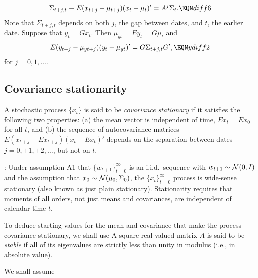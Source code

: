 $$ \Sigma_{t+j,t} \equiv E (x_{t+j} - \mu_{t+j}) (x_t - \mu_t)' =
       A^j \Sigma_t. \EQN diff6 $$
Note that $\Sigma_{t+j,t}$ depends on both $j$, the gap between dates, and $t$, the earlier
date.
%
Suppose that $y_t = G x_t$.  Then
 $\mu_{yt}= E y_t = G \mu_t$ and
$$ E (y_{t+j} - \mu_{yt+j}) (y_t - \mu_{yt})'
                              = G \Sigma_{t+j,t} G',  \EQN ydiff2  $$
for $j=0, 1,\ldots$.



\subsection{Covariance stationarity}

%
\medskip
  A stochastic process $\{x_t\}$ is said to
be {\it covariance stationary\/} if it
satisfies the following two properties: (a) the mean vector is
independent of time,
 $ E x_t = E x_0$ for all $t$,
 and (b) the sequence of autocovariance matrices
 $E(x_{t+j} - E x_{t+j})(x_t - E x_t)'$
depends on the separation between dates
 $j = 0, \pm 1, \pm 2, \ldots$, but not on $t$.
\enddefinition
\smallskip


:  Under assumption A1 that $\{w_{t+1}\}_{t=0}^\infty $ is an i.i.d.~sequence
with $w_{t+1} \sim {\cal N}(0,I)$ and the assumption that $x_0 \sim {\cal N}(\mu_0, \Sigma_0)$,
the $\{x_t\}_{t=0}^\infty$ process is wide-sense stationary (also known as  just plain stationary).  Stationarity
requires that moments of all orders, not just means and covariances,  are independent of calendar time $t$.


\medskip


\noindent To  deduce
starting values for the mean and covariance
that make the process covariance
stationary, we shall use
A square real valued matrix $A$ is said to be {\it stable\/} if
all of its eigenvalues   are strictly less than
unity in modulus (i.e., in absolute value).
\enddefinition
\smallskip

\noindent We shall  assume


